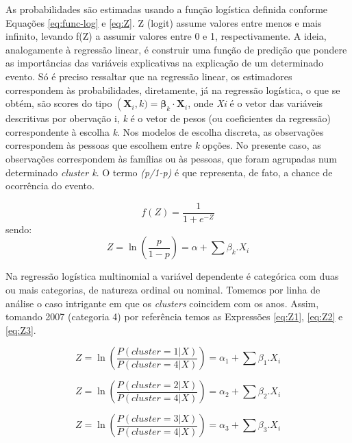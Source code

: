 As probabilidades são estimadas usando a função logística definida conforme Equações \eqref{eq:func-log} e \eqref{eq:Z}. Z (logit) assume valores entre menos e mais infinito, levando f(Z) a assumir valores entre 0 e 1, respectivamente. A ideia, analogamente à regressão linear, é construir uma função de predição que pondere as importâncias das variáveis explicativas na explicação de um determinado evento. Só é preciso ressaltar que na regressão linear, os estimadores correspondem às probabilidades, diretamente, já na regressão logística, o que se obtém, são scores do tipo $\operatorname(\mathbf{X}_i,k) = \boldsymbol\beta_k \cdot \mathbf{X}_i$,
onde \textit{Xi} é o vetor das variáveis descritivas por obervação i, \textit{k} é o vetor de pesos (ou coeficientes da regressão) correspondente à escolha \textit{k}.
Nos modelos de escolha discreta, as observações correspondem às pessoas que escolhem entre \textit{k} opções.
No presente caso, as observações correspondem às famílias ou às pessoas, que foram agrupadas num determinado \textit{cluster k}.
O termo \textit{(p/1-p)} é que representa, de fato, a chance de ocorrência do evento. 

\begin{equation}\label{eq:func-log}
f(Z) = \frac{1}{1+e^{-Z}}
\end{equation}
sendo:
\begin{equation}\label{eq:Z}
Z = \ln \left( \frac{p}{1 - p} \right) = \alpha + \sum\beta_{k}.X_{i} 
\end{equation}

Na regressão logística multinomial a variável dependente é categórica com duas ou mais categorias, de natureza ordinal ou nominal. Tomemos por linha de análise o caso intrigante em que os \textit{clusters} coincidem com os anos. Assim, tomando 2007 (categoria 4) por referência temos as Expressões \eqref{eq:Z1}, \eqref{eq:Z2} e \eqref{eq:Z3}.

\begin{equation}\label{eq:Z1}
Z = \ln \left( \frac{P(cluster=1|X)}{P(cluster=4|X)} \right) = \alpha_{1} + \sum\beta_{1}.X_{i} 
\end{equation}

\begin{equation}\label{eq:Z2}
Z = \ln \left( \frac{P(cluster=2|X)}{P(cluster=4|X)} \right) = \alpha_{2} + \sum\beta_{2}.X_{i} 
\end{equation}

\begin{equation}\label{eq:Z3}
Z = \ln \left( \frac{P(cluster=3|X)}{P(cluster=4|X)} \right) = \alpha_{3} + \sum\beta_{3}.X_{i} 
\end{equation}

